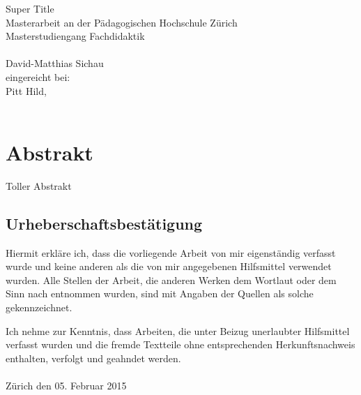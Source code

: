\documentclass[12pt,twoside]{scrbook}
\begin{document}
\frontmatter

\begin{titlepage}
	\vspace*{2cm}
	\begin{center}
		{\LARGE Super Title \vspace*{2cm}\\ Masterarbeit an der Pädagogischen Hochschule Zürich\vspace*{1cm}\\Masterstudiengang Fachdidaktik\\}
		\vspace*{2cm}{\normalsize vorgelegt von:}\\ \large David-Matthias Sichau \\
		\vspace*{1.5cm} {\normalsize  eingereicht bei:}\\ \large Pitt Hild, \\
		\vspace*{2cm}{\large 05. Februar 2015, Zürich}\\
	\end{center}
\end{titlepage}



\frontmatter 
\tableofcontents



\chapter*{Abstrakt}





Toller Abstrakt
\section*{Urheberschaftsbestätigung}

Hiermit erkläre ich, dass die vorliegende Arbeit von mir eigenständig verfasst wurde und keine anderen als die von mir angegebenen Hilfsmittel verwendet wurden. Alle Stellen der Arbeit, die anderen Werken dem Wortlaut oder dem Sinn nach entnommen wurden, sind mit Angaben der Quellen als solche gekennzeichnet.

Ich nehme zur Kenntnis, dass Arbeiten, die unter Beizug unerlaubter Hilfsmittel verfasst wurden und die fremde Textteile ohne entsprechenden Herkunftsnachweis enthalten, verfolgt und geahndet werden.
\\
\\Zürich den 05. Februar 2015
\end{document}
